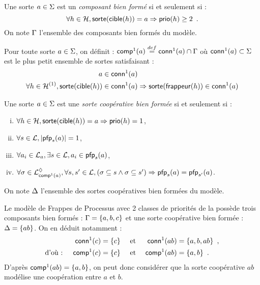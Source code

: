 \begin{definition}
  Une sorte $a \in \PHs$ est un \emph{composant bien formé} si et seulement si :
    \[\forall h \in \PHh, \PHsort(\target{h}) = a \Rightarrow \prio(h) \geq 2 \enspace.\]
  On note $\components$ l'ensemble des composants bien formés du modèle.
\end{definition}

\begin{definition}
  Pour toute sorte $a \in \PHs$, on définit : $\compin(a) \DEF \conn(a) \cap \components$ où
  $\conn(a) \subset \PHs$ est le plus petit ensemble de sortes satisfaisant :
  \begin{align*}
    a \in \conn(a) & \\
    \forall h \in \PHh^{(1)},
      \sort{\target{h}} \in \conn(a) & \Rightarrow \sort{\hitter{h}} \in \conn(a)
  \end{align*}
\end{definition}

\begin{definition}
  Une sorte $a \in \PHs$ est une \emph{sorte coopérative bien formée} si et seulement si :
  \begin{enumerate}[(i)]
    \item $\forall h \in \PHh, \sort{\target{h}} = a \Rightarrow \prio(h) = 1$,
    \item \label{csai} $\forall s \in \PHl, \card{\pfp_s(a)} = 1$,
    \item \label{css} $\forall a_i \in \PHl_a, \exists s \in \PHl, a_i \in \pfp_s(a)$,
    \item $\forall \mysigma \in \PHsubl[\PHl]_{\compin(a)}, \forall s, s' \in \PHl,
        (\mysigma \subseteq s \wedge \mysigma \subseteq s') \Rightarrow \pfp_s(a) = \pfp_{s'}(a)$.
  \end{enumerate}
  On note $\cs$ l'ensemble des sortes coopératives bien formées du modèle.
\end{definition}

\begin{example}
  Le modèle de Frappes de Processus avec 2 classes de priorités de la 
  possède trois composants bien formés : $\components = \{ a, b, c \}$
  et une sorte coopérative bien formée : $\cs = \{ ab \}$.
  On en déduit notamment :
  \begin{align*}
                   && \conn(c) &= \{ c \} &\text{ et } &&\conn(ab) &= \{ a, b, ab \} \enspace, \\
    \text{d'où : } && \compin(c) &= \{ c \} &\text{ et } &&\compin(ab) &= \{ a, b \} \enspace. \\
  \end{align*}
  D'après $\compin(ab) = \{ a, b \}$,
  on peut donc considérer que la sorte coopérative $ab$ modélise une coopération
  entre $a$ et $b$.
\end{example}

